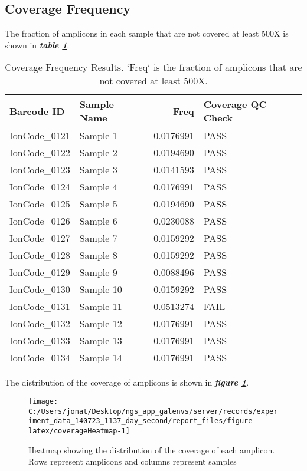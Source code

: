 \documentclass[
]{article}
\begin{document}
\hypertarget{coverage-frequency}{%
\subsection{Coverage Frequency}\label{coverage-frequency}}

The fraction of amplicons in each sample that are not covered at least 500X is shown in \textbf{\emph{table \ref{tab:coverageFrequencyResults}}}.

\begin{longtable}[t]{llrl}
\caption{\label{tab:coverageFrequencyResults}Coverage Frequency Results. `Freq` is the fraction of amplicons that are not covered at least 500X.}\\
\toprule
Barcode ID & Sample Name & Freq & Coverage QC Check\\
\midrule
IonCode\_0121 & Sample 1 & 0.0176991 & PASS\\
IonCode\_0122 & Sample 2 & 0.0194690 & PASS\\
IonCode\_0123 & Sample 3 & 0.0141593 & PASS\\
IonCode\_0124 & Sample 4 & 0.0176991 & PASS\\
IonCode\_0125 & Sample 5 & 0.0194690 & PASS\\
\addlinespace
IonCode\_0126 & Sample 6 & 0.0230088 & PASS\\
IonCode\_0127 & Sample 7 & 0.0159292 & PASS\\
IonCode\_0128 & Sample 8 & 0.0159292 & PASS\\
IonCode\_0129 & Sample 9 & 0.0088496 & PASS\\
IonCode\_0130 & Sample 10 & 0.0159292 & PASS\\
\addlinespace
IonCode\_0131 & Sample 11 & 0.0513274 & FAIL\\
IonCode\_0132 & Sample 12 & 0.0176991 & PASS\\
IonCode\_0133 & Sample 13 & 0.0176991 & PASS\\
IonCode\_0134 & Sample 14 & 0.0176991 & PASS\\
\bottomrule
\end{longtable}

The distribution of the coverage of amplicons is shown in \textbf{\emph{figure \ref{fig:coverageHeatmap}}}.

\begin{figure}
\texttt{[image: C:/Users/jonat/Desktop/ngs\_app\_galenvs/server/records/experiment\_data\_140723\_1137\_day\_second/report\_files/figure-latex/coverageHeatmap-1]} \caption[Coverage Heatmap]{Heatmap showing the distribution of the coverage of each amplicon. Rows represent amplicons and columns represent samples}\label{fig:coverageHeatmap}
\end{figure}
\end{document}
